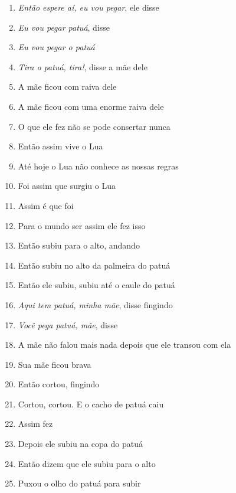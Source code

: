 \begin{enumerate}
\begin{center}\end{center}

\item \textit{Então espere aí, eu vou pegar}, ele disse
\item \textit{Eu vou pegar patuá}, disse
\item \textit{Eu vou pegar o patuá}
\item \textit{Tira o patuá, tira!}, disse a mãe dele
\item A mãe ficou com raiva dele
\item A mãe ficou com uma enorme raiva dele
\item O que ele fez não se pode consertar nunca

\begin{center}\end{center}

\item Então assim vive o Lua
\item Até hoje o Lua não conhece as nossas regras
\item Foi assim que surgiu o Lua
\item Assim é que foi
\item Para o mundo ser assim ele fez isso

\begin{center}\end{center}

\item Então subiu para o alto, andando
\item Então subiu no alto da palmeira do patuá
\item Então ele subiu, subiu até o caule do patuá
\item \textit{Aqui tem patuá, minha mãe}, disse fingindo
\item \textit{Você pega patuá, mãe}, disse
\item A mãe não falou mais nada depois que ele transou com ela
\item Sua mãe ficou brava

\begin{center}\end{center}

\item Então cortou, fingindo
\item Cortou, cortou. E o cacho de patuá caiu
\item Assim fez
\item Depois ele subiu na copa do patuá
\item Então dizem que ele subiu para o alto
\item Puxou o olho do patuá para subir


\end{enumerate}
